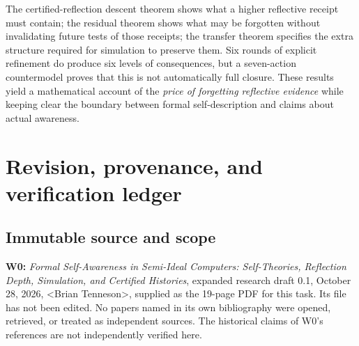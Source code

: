 \documentclass[11pt,letterpaper]{article}
\newcommand{\authorname}{\textless Brian Tenneson\textgreater}
\begin{document}
The certified-reflection descent theorem shows what a higher reflective receipt must contain; the residual theorem shows what may be forgotten without invalidating future tests of those receipts; the transfer theorem specifies the extra structure required for simulation to preserve them. Six rounds of explicit refinement do produce six levels of consequences, but a seven-action countermodel proves that this is not automatically full closure. These results yield a mathematical account of the \emph{price of forgetting reflective evidence} while keeping clear the boundary between formal self-description and claims about actual awareness.

\clearpage
\appendix
\section{Revision, provenance, and verification ledger}\label{app:ledger}
\subsection*{Immutable source and scope}
\textbf{W0:} \emph{Formal Self-Awareness in Semi-Ideal Computers: Self-Theories, Reflection Depth, Simulation, and Certified Histories}, expanded research draft 0.1, October 28, 2026, \authorname, supplied as the 19-page PDF for this task. Its file has not been edited. No papers named in its own bibliography were opened, retrieved, or treated as independent sources. The historical claims of W0's references are not independently verified here.
\end{document}
